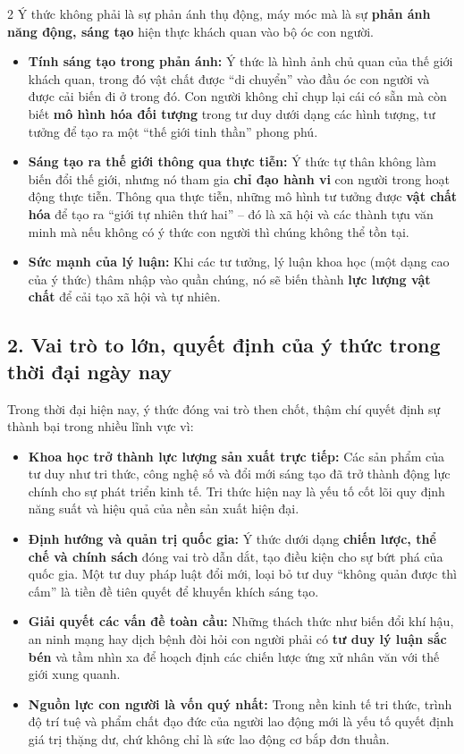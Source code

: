 \documentclass[9pt,a4paper]{extarticle}
\begin{document}
\begin{multicols*}{2}
Ý thức không phải là sự phản ánh thụ động, máy móc mà là sự \textbf{phản ánh năng động, sáng tạo} hiện thực khách quan vào bộ óc con người.

\begin{itemize}
\item \textbf{Tính sáng tạo trong phản ánh:} Ý thức là hình ảnh chủ quan của thế giới khách quan, trong đó vật chất được ``di chuyển'' vào đầu óc con người và được cải biến đi ở trong đó. Con người không chỉ chụp lại cái có sẵn mà còn biết \textbf{mô hình hóa đối tượng} trong tư duy dưới dạng các hình tượng, tư tưởng để tạo ra một ``thế giới tinh thần'' phong phú.
\item \textbf{Sáng tạo ra thế giới thông qua thực tiễn:} Ý thức tự thân không làm biến đổi thế giới, nhưng nó tham gia \textbf{chỉ đạo hành vi} con người trong hoạt động thực tiễn. Thông qua thực tiễn, những mô hình tư tưởng được \textbf{vật chất hóa} để tạo ra ``giới tự nhiên thứ hai'' -- đó là xã hội và các thành tựu văn minh mà nếu không có ý thức con người thì chúng không thể tồn tại.
\item \textbf{Sức mạnh của lý luận:} Khi các tư tưởng, lý luận khoa học (một dạng cao của ý thức) thâm nhập vào quần chúng, nó sẽ biến thành \textbf{lực lượng vật chất} để cải tạo xã hội và tự nhiên.
\end{itemize}

\subsection*{2. Vai trò to lớn, quyết định của ý thức trong thời đại ngày nay}

Trong thời đại hiện nay, ý thức đóng vai trò then chốt, thậm chí quyết định sự thành bại trong nhiều lĩnh vực vì:

\begin{itemize}
\item \textbf{Khoa học trở thành lực lượng sản xuất trực tiếp:} Các sản phẩm của tư duy như tri thức, công nghệ số và đổi mới sáng tạo đã trở thành động lực chính cho sự phát triển kinh tế. Tri thức hiện nay là yếu tố cốt lõi quy định năng suất và hiệu quả của nền sản xuất hiện đại.
\item \textbf{Định hướng và quản trị quốc gia:} Ý thức dưới dạng \textbf{chiến lược, thể chế và chính sách} đóng vai trò dẫn dắt, tạo điều kiện cho sự bứt phá của quốc gia. Một tư duy pháp luật đổi mới, loại bỏ tư duy ``không quản được thì cấm'' là tiền đề tiên quyết để khuyến khích sáng tạo.
\item \textbf{Giải quyết các vấn đề toàn cầu:} Những thách thức như biến đổi khí hậu, an ninh mạng hay dịch bệnh đòi hỏi con người phải có \textbf{tư duy lý luận sắc bén} và tầm nhìn xa để hoạch định các chiến lược ứng xử nhân văn với thế giới xung quanh.
\item \textbf{Nguồn lực con người là vốn quý nhất:} Trong nền kinh tế tri thức, trình độ trí tuệ và phẩm chất đạo đức của người lao động mới là yếu tố quyết định giá trị thặng dư, chứ không chỉ là sức lao động cơ bắp đơn thuần.
\end{itemize}


\end{multicols*}
\end{document}
